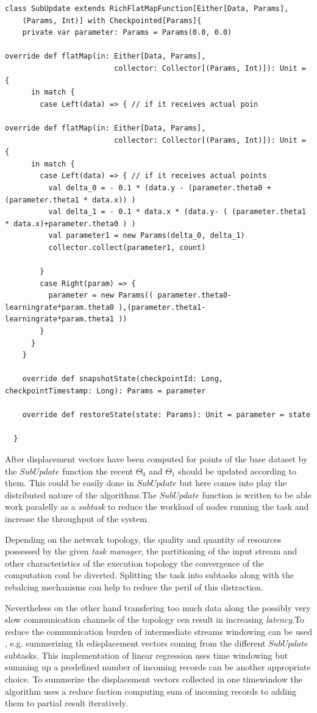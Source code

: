 \begin{lstlisting}
class SubUpdate extends RichFlatMapFunction[Either[Data, Params],
    (Params, Int)] with Checkpointed[Params]{
    private var parameter: Params = Params(0.0, 0.0)
  
override def flatMap(in: Either[Data, Params],
                         collector: Collector[(Params, Int)]): Unit = {
      in match {
        case Left(data) => { // if it receives actual poin
  
override def flatMap(in: Either[Data, Params],
                         collector: Collector[(Params, Int)]): Unit = {
      in match {
        case Left(data) => { // if it receives actual points
          val delta_0 = - 0.1 * (data.y - (parameter.theta0 + (parameter.theta1 * data.x)) )   
          val delta_1 = - 0.1 * data.x * (data.y- ( (parameter.theta1 * data.x)+parameter.theta0 ) )
          val parameter1 = new Params(delta_0, delta_1)
          collector.collect(parameter1, count)

        }
        case Right(param) => {
          parameter = new Params(( parameter.theta0-learningrate*param.theta0 ),(parameter.theta1- learningrate*param.theta1 ))
        }
      }
    }

    override def snapshotState(checkpointId: Long, checkpointTimestamp: Long): Params = parameter

    override def restoreState(state: Params): Unit = parameter = state

  }
\end{lstlisting}

After displacement vectors have been computed for points of the base dataset by the $SubUpdate$ function the recent $\Theta_0$ and $\Theta_1$ should be updated according to them. This could be easily done in $SubUpdate$ but here comes into play the distributed nature of the algorithms.The $SubUpdate$ function is written to be able work paralelly as a \textit{subtask} to reduce the workload of nodes running the task and increase the throughput of the system. 

Depending on the network topology, the quality and quantity  of resources possessed by the given \textit{task manager}, the partitioning of the input stream  and other characteristics of the execution topology the convergence of the computation coul be diverted. Splitting the task into subtasks along with the rebalcing mechanisms can help to reduce the peril of this distraction.

Nevertheless on the other hand transfering too much data along the possibly very slow communication channels of the topology cen result in increasing \textit{latency}.To reduce the communication burden of intermediate streams windowing can be used , e.g. summerizing th edisplacement vectors coming from the  different $SubUpdate$ subtasks. This implementation of linear regression uses time windowing but summing up a predefined number of incoming records can be another appropriate choice.
To summerize the displacement vectors collected in one timewindow the algorithm uses  a reduce fuction computing sum of incoming records to adding them to partial result iteratively.

